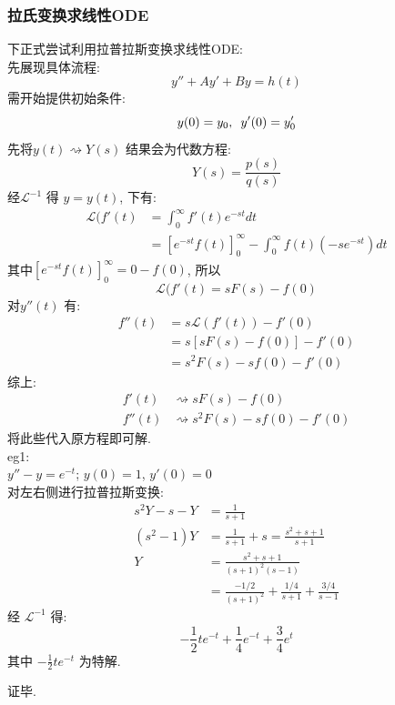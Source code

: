 \subsubsection{\large 拉氏变换求线性ODE}
下正式尝试利用拉普拉斯变换求线性ODE:\\
先展现具体流程:
\[ y'' + A y' + B y = h(t)  \]
需开始提供初始条件:
\[ y(0) = y_0, \hspace*{0.5em} y'(0) = y'_0 \]
先将$y(t) \rightsquigarrow Y(s) $ 结果会为代数方程:
\[ Y(s) = \frac{p(s)}{q(s)}  \]
经$\mathcal{L}^{-1}$ 得 $y = y(t)$, 下有:
\begin{align*}
   \mathcal{L}(f'(t) &= \int_0^\infty f'(t) e^{-st} dt \\
   &= \left[e^{-st} f(t)\right]_0^\infty - \int_0^\infty f(t) (-s e^{-st}) dt  
\end{align*}
其中$\left[e^{-st} f(t)\right]_0^\infty = 0 - f(0)$, 所以
\[ \mathcal{L}(f'(t) = s F(s) - f(0) \]
对$y''(t)$ 有:
\begin{align*}
   f''(t) &= s \mathcal{L}(f'(t)) - f'(0) \\
   &= s[s F(s) - f(0)] - f'(0) \\
   &= s^2 F(s) - sf(0) - f'(0)
\end{align*}
综上:
\begin{align*}
   f'(t) &\rightsquigarrow s F(s) - f(0) \\
   f''(t) &\rightsquigarrow s^2 F(s) - sf(0) - f'(0)
\end{align*}
将此些代入原方程即可解.\\[1em]
eg1:\\
$y'' - y = e^{-t}$; $y(0) = 1$, $y'(0) = 0$\\
对左右侧进行拉普拉斯变换:
\begin{align*}
   s^2 Y - s - Y &= \frac{1}{s+1}\\
   (s^2 - 1) Y &= \frac{1}{s+1} + s = \frac{s^2 + s + 1}{s+1}\\
   Y &= \frac{s^2 + s + 1}{(s+1)^2(s-1)}\\
    &= \frac{- 1/2}{(s+1)^2} + \frac{1/4}{s+1} + \frac{3/4}{s-1}
\end{align*}
经 $\mathcal{L}^{-1}$ 得:
\[ - \frac{1}{2} t e^{-t} + \frac{1}{4} e^{-t} + \frac{3}{4} e^t \]
其中 $- \frac{1}{2} t e^{-t}$ 为特解.

\hfill 证毕.

